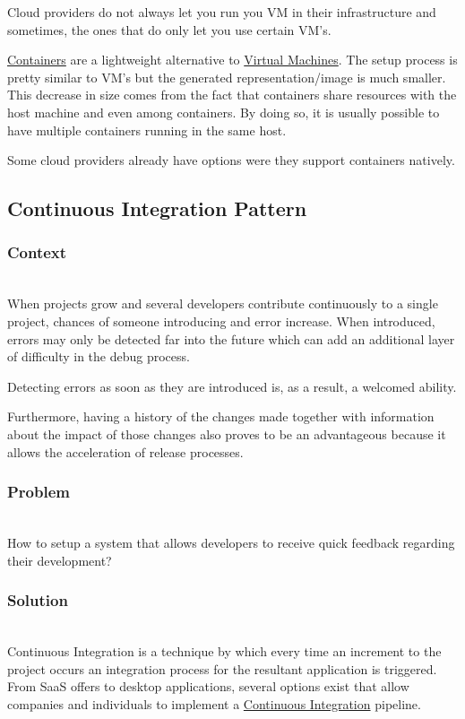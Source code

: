 \documentclass{llncs}
\begin{document}
			Cloud providers do not always let you run you VM in their infrastructure and sometimes, the ones that do only let you use certain VM's.

			\underline{Containers} are a lightweight alternative to \underline{Virtual Machines}. The setup process is pretty similar to VM's but the generated representation/image is much smaller. This decrease in size comes from the fact that containers share resources with the host machine and even among containers. By doing so, it is usually possible to have multiple containers running in the same host.

			Some cloud providers already have options were they support containers natively.
	\subsection{Continuous Integration Pattern}
		\subsubsection{Context}~\\
			When projects grow and several developers contribute continuously to a single project, chances of someone introducing and error increase. When introduced, errors may only be detected far into the future which can add an additional layer of difficulty in the debug process.

			Detecting errors as soon as they are introduced is, as a result, a welcomed ability.

			Furthermore, having a history of the changes made together with information about the impact of those changes also proves to be an advantageous because it allows the acceleration of release processes.
		\subsubsection{Problem}~\\

			How to setup a system that allows developers to receive quick feedback regarding their development?

		\subsubsection{Solution}~\\

      Continuous Integration is a technique by which every time an increment to the project occurs an integration process for the resultant application is triggered. From SaaS offers to desktop applications, several options exist that allow companies and individuals to implement a \underline{Continuous Integration} pipeline.
\end{document}
